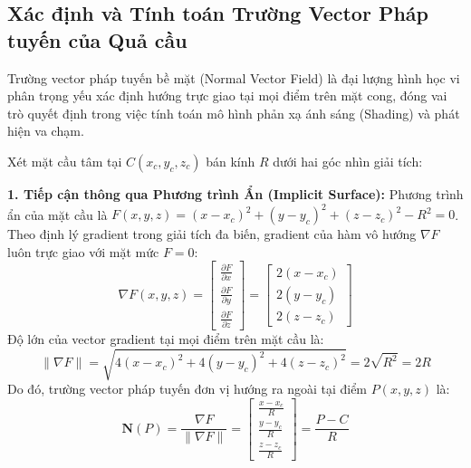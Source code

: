 \subsection{Xác định và Tính toán Trường Vector Pháp tuyến của Quả cầu}
\label{subsec:sphere_normal_vector_field}

Trường vector pháp tuyến bề mặt (Normal Vector Field) là đại lượng hình học vi phân trọng yếu xác định hướng trực giao tại mọi điểm trên mặt cong, đóng vai trò quyết định trong việc tính toán mô hình phản xạ ánh sáng (Shading) và phát hiện va chạm.

Xét mặt cầu tâm tại $C(x_c, y_c, z_c)$ bán kính $R$ dưới hai góc nhìn giải tích:

\textbf{1. Tiếp cận thông qua Phương trình Ẩn (Implicit Surface):}
Phương trình ẩn của mặt cầu là $F(x, y, z) = (x - x_c)^2 + (y - y_c)^2 + (z - z_c)^2 - R^2 = 0$.
Theo định lý gradient trong giải tích đa biến, gradient của hàm vô hướng $\nabla F$ luôn trực giao với mặt mức $F = 0$:
\begin{equation}
\nabla F(x, y, z) = \begin{bmatrix} \frac{\partial F}{\partial x} \\ \frac{\partial F}{\partial y} \\ \frac{\partial F}{\partial z} \end{bmatrix} = \begin{bmatrix} 2(x - x_c) \\ 2(y - y_c) \\ 2(z - z_c) \end{bmatrix}
\end{equation}
Độ lớn của vector gradient tại mọi điểm trên mặt cầu là:
\begin{equation}
\|\nabla F\| = \sqrt{4(x - x_c)^2 + 4(y - y_c)^2 + 4(z - z_c)^2} = 2\sqrt{R^2} = 2R
\end{equation}
Do đó, trường vector pháp tuyến đơn vị hướng ra ngoài tại điểm $P(x, y, z)$ là:
\begin{equation}
\label{eq:sphere_normal_implicit}
\mathbf{N}(P) = \frac{\nabla F}{\|\nabla F\|} = \begin{bmatrix} \frac{x - x_c}{R} \\ \frac{y - y_c}{R} \\ \frac{z - z_c}{R} \end{bmatrix} = \frac{P - C}{R}
\end{equation}

